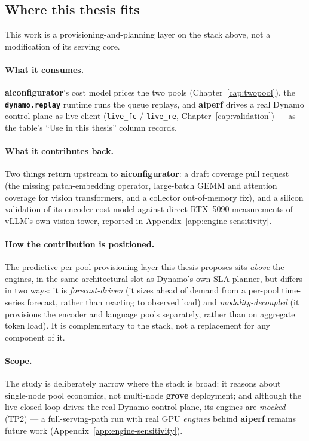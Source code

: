 \subsection{Where this thesis fits}

This work is a provisioning-and-planning layer on the stack above, not a
modification of its serving core.

\paragraph{What it consumes.} \textbf{aiconfigurator}'s cost model prices the two
pools (Chapter~\ref{cap:twopool}), the \textbf{\texttt{dynamo.replay}} runtime
runs the queue replays, and \textbf{aiperf} drives a real Dynamo control plane as
live client (\texttt{live\_fc} / \texttt{live\_re}, Chapter~\ref{cap:validation})
--- as the table's ``Use in this thesis'' column records.

\paragraph{What it contributes back.} Two things return upstream to
\textbf{aiconfigurator}: a draft coverage pull request (the missing
patch-embedding operator, large-batch GEMM and attention coverage for vision
transformers, and a collector out-of-memory fix), and a silicon validation of
its encoder cost model against direct RTX~5090 measurements of vLLM's own vision
tower, reported in Appendix~\ref{app:engine-sensitivity}.

\paragraph{How the contribution is positioned.} The predictive per-pool
provisioning layer this thesis proposes sits \emph{above} the engines, in the
same architectural slot as Dynamo's own SLA planner, but differs in two ways: it
is \emph{forecast-driven} (it sizes ahead of demand from a per-pool time-series
forecast, rather than reacting to observed load) and \emph{modality-decoupled}
(it provisions the encoder and language pools separately, rather than on
aggregate token load). It is complementary to the stack, not a replacement for
any component of it.

\paragraph{Scope.} The study is deliberately narrow where the stack is broad: it
reasons about single-node pool economics, not multi-node \textbf{grove}
deployment; and although the live closed loop drives the real Dynamo control
plane, its engines are \emph{mocked} (TP2) --- a full-serving-path run with real
GPU \emph{engines} behind \textbf{aiperf} remains future work
(Appendix~\ref{app:engine-sensitivity}).
